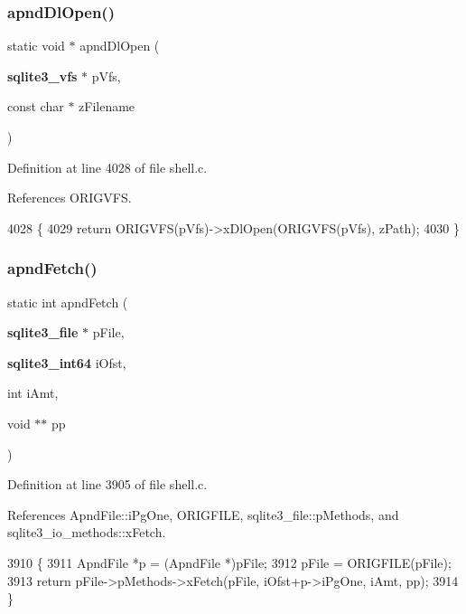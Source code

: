 \subsubsection{apnd\+Dl\+Open()}
{\footnotesize\ttfamily static void $\ast$ apnd\+Dl\+Open (\begin{DoxyParamCaption}\item[{\textbf{ sqlite3\+\_\+vfs} $\ast$}]{p\+Vfs,  }\item[{const char $\ast$}]{z\+Filename }\end{DoxyParamCaption})\hspace{0.3cm}{\ttfamily [static]}}



Definition at line 4028 of file shell.\+c.



References O\+R\+I\+G\+V\+FS.


\begin{DoxyCode}
4028                                                              \{
4029   \textcolor{keywordflow}{return} ORIGVFS(pVfs)->xDlOpen(ORIGVFS(pVfs), zPath);
4030 \}
\end{DoxyCode}
\mbox{\label{shell_8c_aecf1b767179a22297388ab3d0effadfe}} 
\subsubsection{apnd\+Fetch()}
{\footnotesize\ttfamily static int apnd\+Fetch (\begin{DoxyParamCaption}\item[{\textbf{ sqlite3\+\_\+file} $\ast$}]{p\+File,  }\item[{\textbf{ sqlite3\+\_\+int64}}]{i\+Ofst,  }\item[{int}]{i\+Amt,  }\item[{void $\ast$$\ast$}]{pp }\end{DoxyParamCaption})\hspace{0.3cm}{\ttfamily [static]}}



Definition at line 3905 of file shell.\+c.



References Apnd\+File\+::i\+Pg\+One, O\+R\+I\+G\+F\+I\+LE, sqlite3\+\_\+file\+::p\+Methods, and sqlite3\+\_\+io\+\_\+methods\+::x\+Fetch.


\begin{DoxyCode}
3910  \{
3911   ApndFile *p = (ApndFile *)pFile;
3912   pFile = ORIGFILE(pFile);
3913   \textcolor{keywordflow}{return} pFile->pMethods->xFetch(pFile, iOfst+p->iPgOne, iAmt, pp);
3914 \}
\end{DoxyCode}
\mbox{\label{shell_8c_a44b6c832481d3f9181f7c5e49fb02dc6}} 
